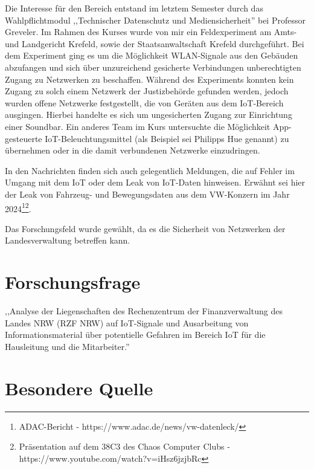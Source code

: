 \documentclass[12pt, a4paper, onecolumn, oneside, toc=bibliographynumbered, liststotoc]{scrartcl} %
\begin{document}
Die Interesse für den Bereich entstand im letztem Semester durch das Wahlpflichtmodul ,,Technischer Datenschutz und Mediensicherheit'' bei Professor Greveler. Im Rahmen des Kurses wurde von mir ein Feldexperiment am Amts- und Landgericht Krefeld, sowie der Staatsanwaltschaft Krefeld durchgeführt. Bei dem Experiment ging es um die Möglichkeit WLAN-Signale aus den Gebäuden abzufangen und sich über unzureichend gesicherte Verbindungen unberechtigten Zugang zu Netzwerken zu beschaffen. Während des Experiments konnten kein Zugang zu solch einem Netzwerk der Justizbehörde gefunden werden, jedoch wurden offene Netzwerke festgestellt, die von Geräten aus dem IoT-Bereich ausgingen. Hierbei handelte es sich um ungesicherten Zugang zur Einrichtung einer Soundbar. Ein anderes Team im Kurs untersuchte die Möglichkeit App-gesteuerte IoT-Beleuchtungsmittel (als Beispiel sei Philipps Hue genannt) zu übernehmen oder in die damit verbundenen Netzwerke einzudringen.

In den Nachrichten finden sich auch gelegentlich Meldungen, die auf Fehler im Umgang mit dem IoT oder dem Leak von IoT-Daten hinweisen. Erwähnt sei hier der Leak von Fahrzeug- und Bewegungsdaten aus dem VW-Konzern im Jahr 2024\footnote{ADAC-Bericht - https://www.adac.de/news/vw-datenleck/}\footnote{Präsentation auf dem 38C3 des Chaos Computer Clubs - https://www.youtube.com/watch?v=iHsz6jzjbRc}.

Das Forschungsfeld wurde gewählt, da es die Sicherheit von Netzwerken der Landesverwaltung betreffen kann.

\newpage
	\section{Forschungsfrage}
,,Analyse der Liegenschaften des Rechenzentrum der Finanzverwaltung des Landes NRW (RZF NRW) auf IoT-Signale und Ausarbeitung von Informationsmaterial über potentielle Gefahren im Bereich IoT für die Hausleitung und die Mitarbeiter.''


	\section{Besondere Quelle}

\nocite{*}
\printbibliography %
\end{document}
